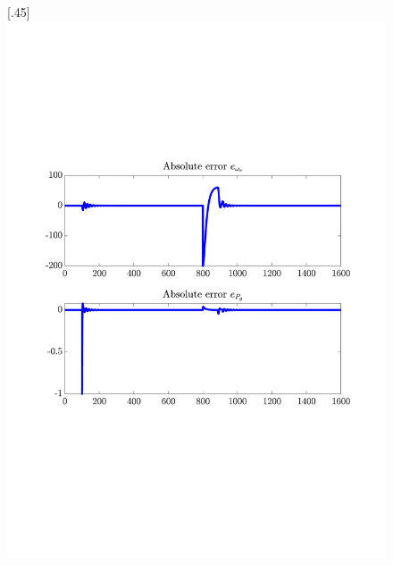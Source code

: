 \begin{figure}[H]
[.45\textwidth]{\includegraphics[width=1\linewidth, scale=1, trim=60 230 55 150,clip]{fig/Open_loop/exp_3_error.pdf}}
\\

\end{figure}

